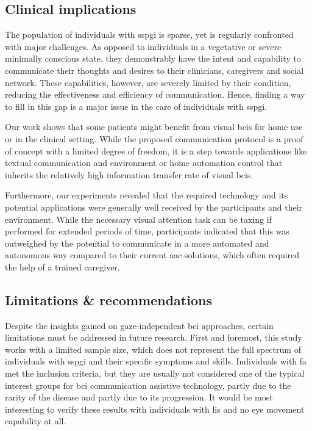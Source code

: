 \documentclass[twocolumn]{article}
\begin{document}
\subsection{Clinical implications}
The population of individuals with \ac{sspgi} is sparse, yet is regularly
confronted with major challenges.
As opposed to individuals in a vegetative or severe minimally conscious state,
they demonstrably have the intent and capability to communicate their thoughts
and desires to their clinicians, caregivers and social network.
These capabilities, however, are severely limited by their condition,
reducing the effectiveness and efficiency of communication.
Hence, finding a way to fill in this gap is a major issue in the care of
individuals with \ac{sspgi}.

Our work shows that some patients might benefit from visual \acp{bci}
for home use or in the clinical setting.
While the proposed communication protocol is a proof of concept with a limited degree
of freedom, it is a step towards applications like textual communication and
environment or home automation control that inherits the relatively high
information transfer rate of visual \acp{bci}.

Furthermore, our experiments revealed that the required technology and its
potential applications were generally well received by the participants and their
environment.
While the necessary visual attention task can be taxing if performed for
extended
periods of time, participants indicated that this was outweighed by the
potential to communicate in a more automated and autonomous way compared to
their current \ac{aac} solutions, which often required the help of a trained caregiver.

\subsection{Limitations \& recommendations}

Despite the insights gained on gaze-independent \ac{bci} approaches, certain limitations must be addressed in future research.
First and foremost, this study works with a limited sample size, which
does not represent the full spectrum of individuals with
\ac{sspgi} and their specific symptoms and skills.
Individuals with \ac{fa} met the inclusion criteria, but they are usually not
considered one of the typical interest groups for \ac{bci} communication assistive
technology, partly due to the rarity of the disease and partly due to its
progression.
It would be most interesting to verify these results with individuals with
\ac{lis} and no eye movement capability at all.
\end{document}
